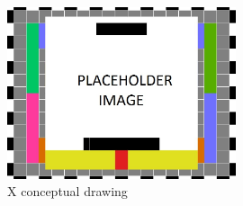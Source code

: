 \begin{figure}[h!]
	\centering
   	\includegraphics[width=0.60\textwidth]{images/test_image}
    \caption{X conceptual drawing}
\end{figure}
